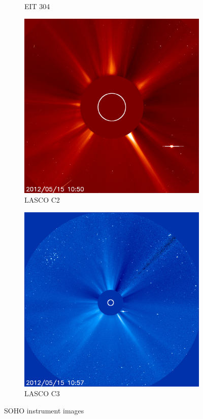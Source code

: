 \documentclass{article}
\begin{document}
\begin{figure}[h!tb]
\begin{subfigure}[b]{0.16\linewidth}
		\caption{EIT 304}
		\label{fig:SOHOEIT304}
	\end{subfigure}
	\begin{subfigure}[b]{0.16\linewidth}
		\centering
		\includegraphics[width=\textwidth]{Figures/SOHOLASCOC2.jpg}
		\caption{LASCO C2}
		\label{fig:SOHOLASCOC2}
	\end{subfigure}
	\begin{subfigure}[b]{0.16\linewidth}
		\centering
		\includegraphics[width=\textwidth]{Figures/SOHOLASCOC3.jpg}
		\caption{LASCO C3}
		\label{fig:SOHOLASCOC3}
	\end{subfigure}
	\caption{SOHO instrument images}
	\label{fig:SOHO}
\end{figure}
\end{document}
